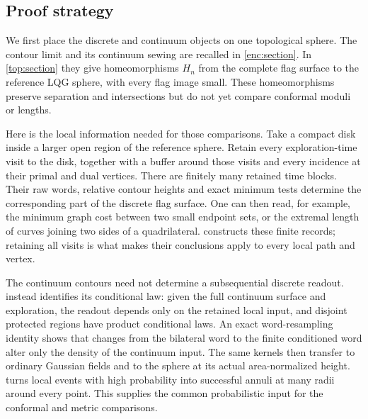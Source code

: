 \subsection{Proof strategy}

We first place the discrete and continuum objects on one topological
sphere. The contour limit and its continuum sewing are recalled in
\cref{enc:section}. In \cref{top:section} they give homeomorphisms
$H_n$ from the complete flag surface to the reference LQG sphere,
with every flag image small. These homeomorphisms preserve separation
and intersections but do not yet compare conformal moduli or lengths.

Here is the local information needed for those comparisons. Take a
compact disk inside a larger open region of the reference sphere.
Retain every exploration-time visit to the disk, together with a
buffer around those visits and every incidence at their primal and
dual vertices. There are finitely many retained time blocks. Their
raw words, relative contour heights and exact minimum tests determine
the corresponding part of the discrete flag surface. One can then
read, for example, the minimum graph cost between two small endpoint
sets, or the extremal length of curves joining two sides of a
quadrilateral.  constructs these finite records;
retaining all visits is what makes their conclusions apply to every
local path and vertex.

The continuum contours need not determine a subsequential discrete
readout.  instead identifies its conditional law:
given the full continuum surface and exploration, the readout depends
only on the retained local input, and disjoint protected regions have
product conditional laws. An exact word-resampling identity shows
that changes from the bilateral word to the finite conditioned word
alter only the density of the continuum input. The same kernels then
transfer to ordinary Gaussian fields and to the sphere at its actual
area-normalized height.  turns local events with
high probability into successful annuli at many radii around every
point. This supplies the common probabilistic input for the conformal
and metric comparisons.

